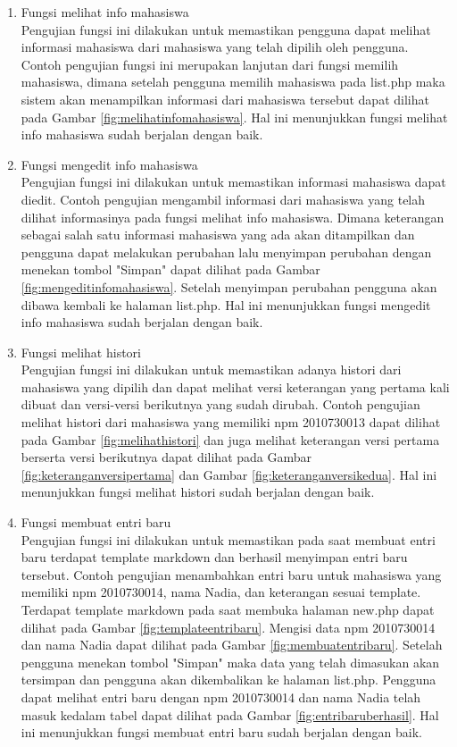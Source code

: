 \begin{enumerate}[(1)]
\item Fungsi melihat info mahasiswa\\
	Pengujian fungsi ini dilakukan untuk memastikan pengguna dapat melihat informasi mahasiswa dari mahasiswa yang telah dipilih oleh pengguna. Contoh pengujian fungsi ini merupakan lanjutan dari fungsi memilih mahasiswa, dimana setelah pengguna memilih mahasiswa pada list.php maka sistem akan menampilkan informasi dari mahasiswa tersebut dapat dilihat pada Gambar \ref{fig:melihatinfomahasiswa}. Hal ini menunjukkan fungsi melihat info mahasiswa sudah berjalan dengan baik.
	
\item Fungsi mengedit info mahasiswa\\
	Pengujian fungsi ini dilakukan untuk memastikan informasi mahasiswa dapat diedit. Contoh pengujian mengambil informasi dari mahasiswa yang telah dilihat informasinya pada fungsi melihat info mahasiswa. Dimana keterangan sebagai salah satu informasi mahasiswa yang ada akan ditampilkan dan pengguna dapat melakukan perubahan lalu menyimpan perubahan dengan menekan tombol "Simpan" dapat dilihat pada Gambar \ref{fig:mengeditinfomahasiswa}. Setelah menyimpan perubahan pengguna akan dibawa kembali ke halaman list.php. Hal ini menunjukkan fungsi mengedit info mahasiswa sudah berjalan dengan baik.
	
\item Fungsi melihat histori\\
	Pengujian fungsi ini dilakukan untuk memastikan adanya histori dari mahasiswa yang dipilih dan dapat melihat versi keterangan yang pertama kali dibuat dan versi-versi berikutnya yang sudah dirubah. Contoh pengujian melihat histori dari mahasiswa yang memiliki npm 2010730013 dapat dilihat pada Gambar \ref{fig:melihathistori} dan juga melihat keterangan versi pertama berserta versi berikutnya dapat dilihat pada Gambar \ref{fig:keteranganversipertama} dan Gambar \ref{fig:keteranganversikedua}. Hal ini menunjukkan fungsi melihat histori sudah berjalan dengan baik.
	
\item Fungsi membuat entri baru\\
	Pengujian fungsi ini dilakukan untuk memastikan pada saat membuat entri baru terdapat template markdown dan berhasil menyimpan entri baru tersebut. Contoh pengujian menambahkan entri baru untuk mahasiswa yang memiliki npm 2010730014, nama Nadia, dan keterangan sesuai template. Terdapat template markdown pada saat membuka halaman new.php dapat dilihat pada Gambar \ref{fig:templateentribaru}. Mengisi data npm 2010730014 dan nama Nadia dapat dilihat pada Gambar \ref{fig:membuatentribaru}. Setelah pengguna menekan tombol "Simpan" maka data yang telah dimasukan akan tersimpan dan pengguna akan dikembalikan ke halaman list.php. Pengguna dapat melihat entri baru dengan npm 2010730014 dan nama Nadia telah masuk kedalam tabel dapat dilihat pada Gambar \ref{fig:entribaruberhasil}. Hal ini menunjukkan fungsi membuat entri baru sudah berjalan dengan baik.
	

\end{enumerate}
